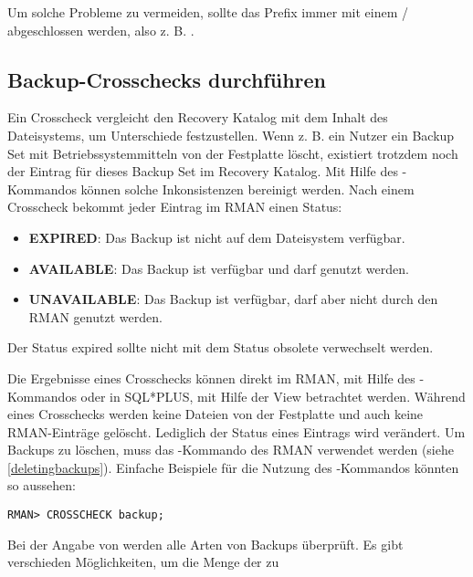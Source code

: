         \begin{merke}
          Um solche Probleme zu vermeiden, sollte das Prefix immer mit einem / abgeschlossen werden, also z. B. .
        \end{merke}
      \subsection{Backup-Crosschecks durchführen}
        Ein Crosscheck vergleicht den Recovery Katalog mit dem Inhalt des Dateisystems, um Unterschiede festzustellen. Wenn z. B. ein Nutzer ein Backup Set mit Betriebssystemmitteln von der Festplatte löscht, existiert trotzdem noch der Eintrag für dieses Backup Set im Recovery Katalog. Mit Hilfe des -Kommandos können solche Inkonsistenzen bereinigt werden.
        Nach einem Crosscheck bekommt jeder Eintrag im RMAN einen Status:
        \begin{itemize}
          \item \textbf{EXPIRED}: Das Backup ist nicht auf dem Dateisystem verfügbar.
          \item \textbf{AVAILABLE}: Das Backup ist verfügbar und darf genutzt werden.
          \item \textbf{UNAVAILABLE}: Das Backup ist verfügbar, darf aber nicht durch den RMAN genutzt werden.
        \end{itemize}
        \begin{merke}
          Der Status expired sollte nicht mit dem Status obsolete verwechselt werden.
        \end{merke}
        Die Ergebnisse eines Crosschecks können direkt im RMAN, mit Hilfe des -Kommandos oder in SQL*PLUS, mit Hilfe der View  betrachtet werden. Während eines Crosschecks werden keine Dateien von der Festplatte und auch keine RMAN-Einträge gelöscht. Lediglich der Status eines Eintrags wird verändert. Um Backups zu löschen, muss das -Kommando des RMAN verwendet werden (siehe \ref{deletingbackups}).
        Einfache Beispiele für die Nutzung des -Kommandos könnten so aussehen:
        \begin{lstlisting}[caption={\languagerman{CROSSCHECK} aller Backups},label=admin1332,language=rman]
RMAN> CROSSCHECK backup;
        \end{lstlisting}
        Bei der Angabe von  werden alle Arten von Backups
        überprüft. Es gibt verschieden Möglichkeiten, um die Menge der zu
